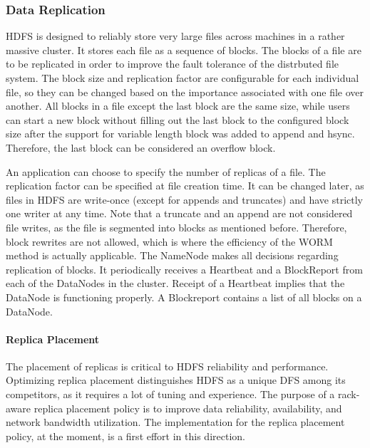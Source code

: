 \documentclass{article}
\begin{document}
\subsubsection{Data Replication}

HDFS is designed to reliably store very large files across machines in a rather massive cluster. It stores each file as a sequence of blocks. The blocks of a file are to be replicated in order to improve the fault tolerance of the distrbuted file system. The block size and replication factor are configurable for each individual file, so they can be changed based on the importance associated with one file over another. All blocks in a file except the last block are the same size, while users can start a new block without filling out the last block to the configured block size after the support for variable length block was added to append and hsync. Therefore, the last block can be considered an overflow block.

An application can  choose to specify the number of replicas of a file. The replication factor can be specified at file creation time. It can be changed later, as files in HDFS are write-once (except for appends and truncates) and have strictly one writer at any time. Note that a truncate and an append are not considered file writes, as the file is segmented into blocks as mentioned before. Therefore, block rewrites are not allowed, which is where the efficiency of the WORM method is actually applicable. The NameNode makes all decisions regarding replication of blocks. It periodically receives a Heartbeat and a BlockReport from each of the DataNodes in the cluster. Receipt of a Heartbeat implies that the DataNode is functioning properly. A Blockreport contains a list of all blocks on a DataNode.

\paragraph{Replica Placement} The placement of replicas is critical to HDFS reliability and performance. Optimizing replica placement distinguishes HDFS as a unique DFS among its competitors, as it requires a lot of tuning and experience. The purpose of a rack-aware replica placement policy is to improve data reliability, availability, and network bandwidth utilization. The implementation for the replica placement policy, at the moment,  is a first effort in this direction.
\end{document}
